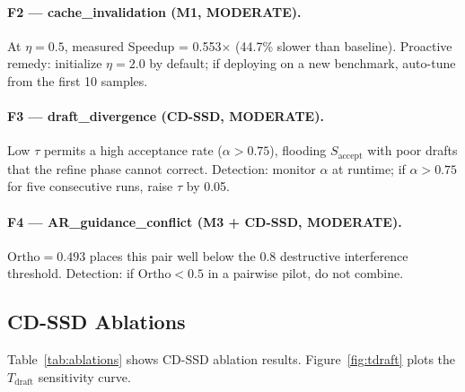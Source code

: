 \documentclass{article}
\newcommand{\ortho}{\text{Ortho}}
\newcommand{\Saccept}{S_{\text{accept}}}
\newcommand{\Tdraft}{T_{\text{draft}}}
\begin{document}
\paragraph{F2 --- cache\_invalidation (M1, MODERATE).} At $\eta = 0.5$, measured Speedup = 0.553$\times$
(44.7\% slower than baseline). Proactive remedy: initialize $\eta = 2.0$ by default; if deploying
on a new benchmark, auto-tune from the first 10 samples.

\paragraph{F3 --- draft\_divergence (CD-SSD, MODERATE).} Low $\tau$ permits a high acceptance rate
($\alpha > 0.75$), flooding $\Saccept$ with poor drafts that the refine phase cannot correct. Detection:
monitor $\alpha$ at runtime; if $\alpha > 0.75$ for five consecutive runs, raise $\tau$ by 0.05.

\paragraph{F4 --- AR\_guidance\_conflict (M3 + CD-SSD, MODERATE).} $\ortho = 0.493$ places this
pair well below the 0.8 destructive interference threshold. Detection: if $\ortho < 0.5$ in a
pairwise pilot, do not combine.

\subsection{CD-SSD Ablations}
\label{sec:cdssd_ablations}

Table~\ref{tab:ablations} shows CD-SSD ablation results. Figure~\ref{fig:tdraft} plots the
$\Tdraft$ sensitivity curve.
\end{document}
